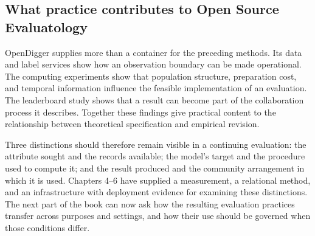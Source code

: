 \subsection{What practice contributes to Open Source Evaluatology}
OpenDigger supplies more than a container for the preceding methods. Its data and label services show how an observation boundary can be made operational. The computing experiments show that population structure, preparation cost, and temporal information influence the feasible implementation of an evaluation. The leaderboard study shows that a result can become part of the collaboration process it describes. Together these findings give practical content to the relationship between theoretical specification and empirical revision.

Three distinctions should therefore remain visible in a continuing evaluation: the attribute sought and the records available; the model's target and the procedure used to compute it; and the result produced and the community arrangement in which it is used. Chapters 4--6 have supplied a measurement, a relational method, and an infrastructure with deployment evidence for examining these distinctions. The next part of the book can now ask how the resulting evaluation practices transfer across purposes and settings, and how their use should be governed when those conditions differ.
